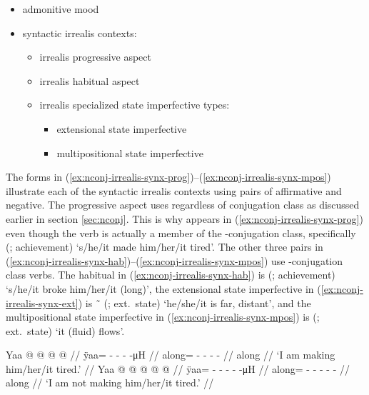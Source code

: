 \begin{multicols}{2}
\begin{itemize}[leftmargin=0.75em]\raggedyright
\item	admonitive mood 
\item	syntactic irrealis contexts:
	\begin{itemize}
	\item	irrealis progressive aspect 
	\item	irrealis habitual aspect 
	\item	irrealis specialized state imperfective types:
		\begin{itemize}
		\item	extensional state imperfective 
		\item	multipositional state imperfective 
		\end{itemize}
	\end{itemize}
\end{itemize}

The forms in (\ref{ex:nconj-irrealis-synx-prog})–(\ref{ex:nconj-irrealis-synx-mpos}) illustrate each of the syntactic irrealis contexts using pairs of affirmative and negative.
The progressive aspect uses  regardless of conjugation class as discussed earlier in section \ref{sec:nconj}.
This is why  appears in (\ref{ex:nconj-irrealis-synx-prog}) even though the verb is actually a member of the -conjugation class, specifically  (; achievement) ‘s/he/it made him/her/it tired’.
The other three pairs in (\ref{ex:nconj-irrealis-synx-hab})–(\ref{ex:nconj-irrealis-synx-mpos}) use -conjugation class verbs.
The habitual in (\ref{ex:nconj-irrealis-synx-hab}) is  (; achievement) ‘s/he/it broke him/her/it (long)’,
the extensional state imperfective in (\ref{ex:nconj-irrealis-synx-ext}) is  \~\  (;  ext.\ state) ‘he/she/it is far, distant’,
and the multipositional state imperfective in (\ref{ex:nconj-irrealis-synx-mpos}) is  (;  ext.\ state) ‘it (fluid) flows’.

\pex\label{ex:nconj-irrealis-synx-prog}%
\a\label{ex:nconj-irrealis-synx-prog-aff}%
%
\begingl
	\gla	Yaa  @ {} @ {} @ {} @ {} //
	\glb	ÿaa= - - -  -μH //
	\glc	along= - - -  - //
	\gld	along  {} {} {} {} //
	\glft	‘I am making him/her/it tired.’
		//
\endgl
\a\label{ex:nconj-irrealis-synx-prog-aff}%
%
\begingl
	\gla	Yaa  @ {} @ {} @ {} @ {} @ {} //
	\glb	ÿaa= - - - -  -μH //
	\glc	along= - - - -  - //
	\gld	along  {} {} {} {} {} //
	\glft	‘I am not making him/her/it tired.’
		//
\endgl
\xe


\end{multicols}
